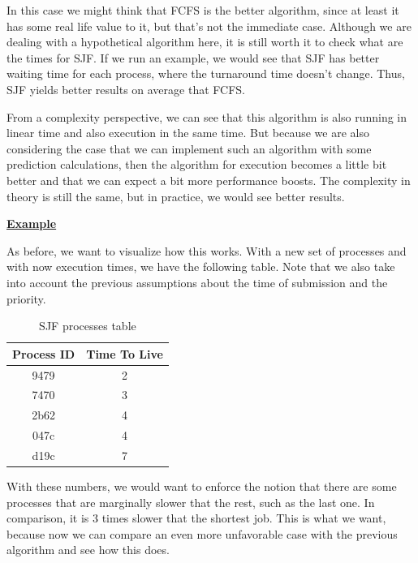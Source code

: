 \documentclass{article}
\begin{document}
In this case we might think that FCFS is the better algorithm, since at least it has some real life value to it, but that's not the immediate case. Although we are dealing with a hypothetical algorithm here, it is still worth it to check what are the times for SJF. If we run an example, we would see that SJF has better waiting time for each process, where the turnaround time doesn't change. Thus, SJF yields better results on average that FCFS.

From a complexity perspective, we can see that this algorithm is also running in linear time and also execution in the same time. But because we are also considering the case that we can implement such an algorithm with some prediction calculations, then the algorithm for execution becomes a little bit better and that we can expect a bit more performance boosts. The complexity in theory is still the same, but in practice, we would see better results.

\bigskip

\underline{\textbf{Example}}

As before, we want to visualize how this works. With a new set of processes and with now execution times, we have the following table. Note that we also take into account the previous assumptions about the time of submission and the priority.

\begin{table}[H]
  \begin{center}
    \label{tab:SJF processes}
    \begin{tabular}{c|c}
      \toprule
      \textbf{Process ID} & \textbf{Time To Live} \\
      \midrule
      9479 & 2 \\
      7470 & 3 \\
      2b62 & 4 \\
      047c & 4 \\
      d19c & 7 \\
      \bottomrule
    \end{tabular}
    \caption{SJF processes table}
  \end{center}
\end{table}

With these numbers, we would want to enforce the notion that there are some processes that are marginally slower that the rest, such as the last one. In comparison, it is 3 times slower that the shortest job. This is what we want, because now we can compare an even more unfavorable case with the previous algorithm and see how this does.
\end{document}
